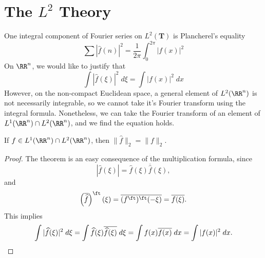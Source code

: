 


\section{The $L^2$ Theory}

One integral component of Fourier series on $L^2(\mathbf{T})$ is Plancherel's equality
%
\[ \sum |\widehat{f}(n)|^2 = \frac{1}{2\pi} \int_0^{2\pi} |f(x)|^2 \]
%
On $\RR^n$, we would like to justify that
%
\[ \int |\widehat{f}(\xi)|^2\; d\xi = \int |f(x)|^2\; dx \]
%
However, on the non-compact Euclidean space, a general element of $L^2(\RR^n)$ is not necessarily integrable, so we cannot take it's Fourier transform using the integral formula. Nonetheless, we can take the Fourier transform of an element of $L^1(\RR^n) \cap L^2(\RR^n)$, and we find the equation holds.

\begin{theorem}
	If $f \in L^1(\RR^n) \cap L^2(\RR^n)$, then $\| \widehat{f} \|_2 = \| f \|_2$.
\end{theorem}
\begin{proof}
	The theorem is an easy consequence of the multiplication formula, since
	\[ |\widehat{f}(\xi)| = \widehat{f}(\xi) \overline{\widehat{f}}(\xi), \]
	and
	\[ \left( \overline{\widehat{f}} \right)^\ft(\xi) = \overline{(f^\ft)^\ft(-\xi)} = \overline{f(\xi)}. \]
	This implies
	\[ \int |\widehat{f}(\xi)|^2\; d\xi = \int \widehat{f}(\xi) \overline{\widehat{f}(\xi)}\; d\xi = \int f(x) \overline{f(x)}\; dx = \int |f(x)|^2\; dx. \qedhere \]
\end{proof}

